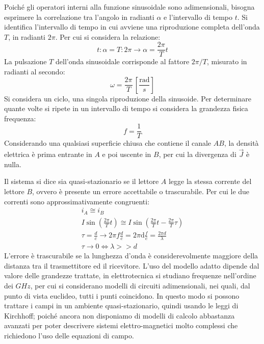 \documentclass{article}
\newcommand{\df}{\mathrm{d}}
\numberwithin{equation}{subsection}
\begin{document}
Poiché gli operatori interni alla funzione sinusoidale sono adimensionali, bisogna esprimere la correlazione tra l'angolo in radianti $\alpha$ e l'intervallo di tempo $t$. 
Si identifica l'intervallo di tempo in cui avviene una riproduzione completa dell'onda $T$, in radianti $2\pi$. Per cui si considera la relazione:
\begin{equation*}
    t:\alpha=T:2\pi\to\displaystyle\alpha=\frac{2\pi}{T}t
\end{equation*}
La pulsazione $T$ dell'onda sinusoidale corrisponde al fattore ${2\pi}/T$, misurato in radianti al secondo:
\begin{equation*}
    \omega=\displaystyle\frac{2\pi}{T}\,\left[\frac{\mbox{rad}}{s}\right]
\end{equation*}
Si considera un ciclo, una singola riproduzione della sinusoide. Per determinare quante volte si ripete in un intervallo di tempo si considera la grandezza fisica frequenza:
\begin{equation*}
    f=\displaystyle\frac{1}{T}
\end{equation*}
Considerando una qualsiasi superficie chiusa che contiene il canale $AB$, la densità elettrica è prima entrante in $A$ e poi uscente in $B$, per cui la divergenza di $\vec J$ 
è nulla.


Il sistema si dice sia quasi-stazionario se il lettore $A$ legge la stessa corrente del lettore $B$, ovvero è presente un errore accettabile o trascurabile. 
Per cui le due correnti sono approssimativamente congruenti:
\begin{gather*}
    i_A\cong i_B\\
    I\sin\displaystyle\left(\frac{2\pi}{T}t\right)\cong I\sin\left(\frac{2\pi}{T}t-\frac{2\pi}{T}\tau\right)\\
    \tau=\displaystyle\frac{d}{c}\to \displaystyle 2\pi f\frac{d}{c}=2\pi \df\frac{f}{c}=\frac{2\pi d}{\lambda}\\
    \tau\to 0\iff \lambda>>d
\end{gather*}
L'errore è trascurabile se la lunghezza d'onda è considerevolmente maggiore della distanza tra il trasmettitore ed il ricevitore. 
L'uso del modello adatto dipende dal valore delle grandezze trattate, in elettrotecnica si studiano frequenze nell'ordine dei $GHz$, per cui si considerano modelli di circuiti adimensionali, nei quali, dal punto di vista euclideo, tutti i punti coincidono. In questo modo si possono 
trattare i campi in un ambiente quasi-stazionario, quindi usando le leggi di Kirchhoff; poiché ancora non disponiamo di modelli di calcolo abbastanza avanzati per poter 
descrivere sistemi elettro-magnetici molto complessi che richiedono l'uso delle equazioni di campo. 
\end{document}
